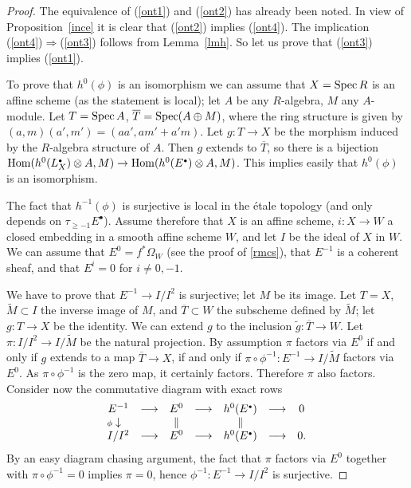 \documentclass[11pt]{article}
\theoremstyle{plain}
\theoremstyle{definition}
\newenvironment{pf}{\begin{proof}}{\end{proof}}
\renewcommand{\tilde}{\widetilde}
\newcommand{\com}{^{\scriptscriptstyle\bullet}}
\newcommand{\spec}{\mathop{\rm Spec}\nolimits}
\newcommand{\Spec}{\spec}
\newcommand{\Hom}{\mathop{\rm Hom}\nolimits}
\newcommand{\ol}{\overline}
\newcommand{\ldiag}[1]
       {\makebox[0cm]{\({\scriptstyle#1}\downarrow\phantom{\scriptstyle#1}\)}}
\providecommand{\Spec}{\operatorname{Spec}}
\theoremstyle{plain}
\theoremstyle{definition}
\theoremstyle{remark}
\begin{document}
\begin{pf}
The equivalence of (\ref{ont1}) and (\ref{ont2}) has already been
noted. In view of Proposition~\ref{ince} it is clear that
(\ref{ont2}) implies (\ref{ont4}). The implication
(\ref{ont4})\(\Rightarrow\)(\ref{ont3}) follows from Lemma~\ref{lmh}. So
let us prove that (\ref{ont3}) implies (\ref{ont1}).

To prove that \(h^0(\phi)\) is an isomorphism we can assume that
\(X=\spec R\) is an affine scheme (as the statement is local); let \(A\)
be any \(R\)-algebra, \(M\) any \(A\)-module.  Let \(T=\Spec A\), \(\ol T=\Spec
(A\oplus M)\), where the ring structure is given by
\((a,m)(a',m')=(aa',am'+a'm)\). Let \(g:T\to X\) be the morphism induced
by the \(R\)-algebra structure of \(A\). Then \(g\) extends to \(\ol T\), so
there is a bijection \(\Hom(h^0(L_X\com)\otimes A,M)\to
\Hom(h^0(E\com)\otimes A,M)\).
This implies easily that \(h^0(\phi)\) is an isomorphism.

The fact that \(h^{-1}(\phi)\) is surjective is local in the \'etale
topology (and only depends on \(\tau_{\ge -1}E\com\)). Assume therefore
that \(X\) is an affine scheme, \(i:X\to W\) a closed embedding in a
smooth affine scheme \(W\), and let \(I\) be the ideal of \(X\) in \(W\). We
can assume that \(E^0=f^*\Omega_W\) (see the proof of
\ref{rmcs}), that \(E^{-1}\) is a coherent sheaf, and that \(E^i=0\) for \(i\ne
0,-1\).

We have to prove that \(E^{-1}\to I/I^2\) is surjective; let \(M\) be its
image.  Let \(T=X\), \(\tilde M\subset I\) the inverse image of \(M\), and
\(\ol T\subset W\) the subscheme defined by \(\tilde M\); let \(g:T\to X\)
be the identity. We can extend \(g\) to the inclusion \(\tilde g:\ol T\to
W\).  Let \(\pi:I/I^2\to I/\tilde M\) be the natural projection. By
assumption \(\pi\) factors via \(E^0\) if and only if \(g\) extends to a map
\(\ol T\to X\), if and only if \(\pi\circ
\phi^{-1}:E^{-1}\to I/\tilde M\) factors via \(E^0\). As
\(\pi\circ\phi^{-1}\) is the zero map, it certainly factors. Therefore
\(\pi\) also factors. Consider now the commutative diagram with exact
rows
\[
\begin{array}{ccccccc}
 E^{-1} & \longrightarrow & E^0 & \longrightarrow & h^0(E\com)
& \longrightarrow & 0 \\
\ldiag{\phi} & & \Vert  & & \Vert & & \\
 I/I^2 & \longrightarrow & E^0 & \longrightarrow & h^0(E\com) &
\longrightarrow & 0.
\end{array}
\]
By an easy diagram chasing argument, the fact that \(\pi\) factors via \(E^0\)
together with \(\pi\circ\phi^{-1}=0\) implies \(\pi=0\), hence
\(\phi^{-1}:E^{-1}\to I/I^2\) is surjective.
\end{pf}
\end{document}
